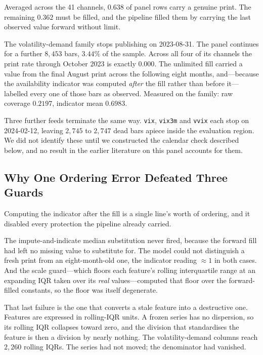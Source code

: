 Averaged across the 41 channels, $0.638$ of panel rows carry a genuine print.
The remaining $0.362$ must be filled, and the pipeline filled them by carrying
the last observed value forward without limit.

The volatility-demand family stops publishing on 2023-08-31. The panel
continues for a further $8{,}453$ bars, $3.44\%$ of the sample. Across all four
of its channels the print rate through October 2023 is exactly $0.000$. The
unlimited fill carried a value from the final August print across the following
eight months, and---because the availability indicator was computed
\emph{after} the fill rather than before it---labelled every one of those bars
as observed. Measured on the family: raw coverage $0.2197$, indicator mean
$0.6983$.

Three further feeds terminate the same way. \texttt{vix}, \texttt{vix3m} and
\texttt{vvix} each stop on 2024-02-12, leaving $2{,}745$ to $2{,}747$ dead bars
apiece inside the evaluation region. We did not identify these until we
constructed the calendar check described below, and no result in the earlier
literature on this panel accounts for them.

\subsection{Why One Ordering Error Defeated Three Guards}

Computing the indicator after the fill is a single line's worth of ordering,
and it disabled every protection the pipeline already carried.

The impute-and-indicate median substitution never fired, because the forward
fill had left no missing value to substitute for. The model could not
distinguish a fresh print from an eight-month-old one, the indicator reading
$\approx 1$ in both cases. And the scale guard---which floors each feature's
rolling interquartile range at an expanding IQR taken over its \emph{real}
values---computed that floor over the forward-filled constants, so the floor
was itself degenerate.

That last failure is the one that converts a stale feature into a destructive
one. Features are expressed in rolling-IQR units. A frozen series has no
dispersion, so its rolling IQR collapses toward zero, and the division that
standardises the feature is then a division by nearly nothing. The
volatility-demand columns reach $2{,}260$ rolling IQRs. The series had not
moved; the denominator had vanished.

